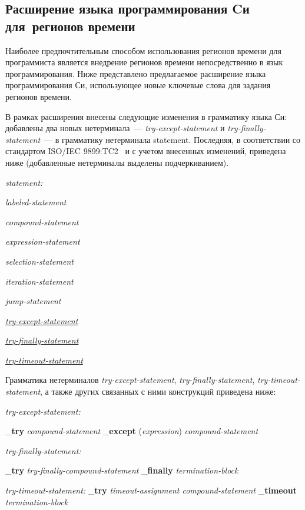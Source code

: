 \begin{multicols}{2}
\section{Расширение языка программирования Cи для~регионов
времени} %

     Наиболее предпочтительным способом использования регионов времени для программиста
является внедрение регионов времени непосредственно в язык программирования. Ниже
представлено предлагаемое расширение языка программирования Си, использующее новые
ключевые слова для задания регионов времени.

     В рамках расширения внесены следующие изменения в грамматику языка Си: добавлены два
новых нетерминала~--- \textit{try-except-statement} и \textit{try-finally-statement}~--- в грамматику
нетерминала statement. Последняя, в соответствии со стандартом ISO/IEC 9899:TC2~\cite{11eg} и с
учетом внесенных изменений, приведена ниже (добавленные нетерминалы выделены
подчеркиванием).

\medskip
\textit{statement:}

\textit{labeled-statement}

\textit{compound-statement}

\textit{expression-statement}

\textit{selection-statement}

   \textit{iteration-statement}

   \textit{jump-statement}

   \underline{\textit{try-except-statement}}

   \underline{\textit{try-finally-statement}}

   \underline{\textit{try-timeout-statement}}

\medskip
     Грамматика нетерминалов \textit{try-except-statement}, \textit{try-finally-statement},
     \textit{try-timeout-statement}, а также других связанных с ними конструкций приведена ниже:

   \medskip
   \textit{try-except-statement:}

   \_\textbf{try} \textit{compound-statement} \_\textbf{except} (\textit{expression})
\textit{compound-statement}

   \medskip
   \textit{try-finally-statement:}

   \_\textbf{try} \textit{try-finally-compound-statement} \_\textbf{finally} \textit{termination-block}

   \medskip
   \textit{try-timeout-statement:}
   \_\textbf{try} \textit{timeout-assignment compound-statement} \_\textbf{timeout}
\textit{termination-block}


\end{multicols}

